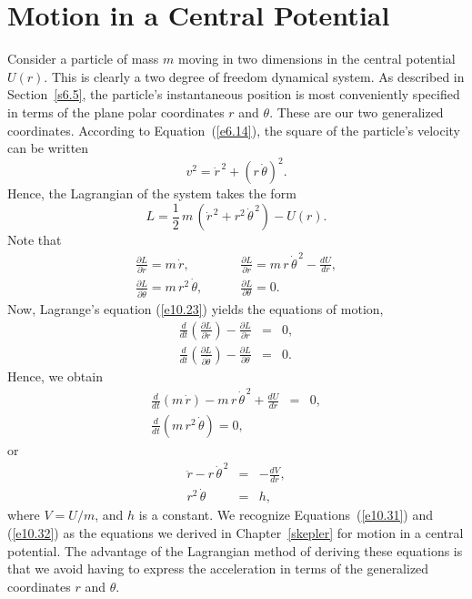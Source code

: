 \section{Motion in a Central Potential}\label{s10.5}
Consider a particle of mass $m$ moving in  two dimensions in the central potential $U(r)$. This is clearly a two degree of freedom dynamical system.
As described in Section~\ref{s6.5}, the particle's instantaneous position
is most conveniently specified in terms of the plane polar
coordinates $r$ and $\theta$. These are our two generalized coordinates.
According to Equation~(\ref{e6.14}), the square of the particle's velocity
can be written
\begin{equation}
v^2 = \dot{r}^{\,2} + (r\,\dot{\theta})^2.
\end{equation}
Hence, the Lagrangian of the system takes the form
\begin{equation}\label{e10.24}
L = \frac{1}{2}\,m\,(\dot{r}^{\,2} + r^2\,\dot{\theta}^{\,2}) - U(r).
\end{equation}
Note that
\begin{eqnarray}
\frac{\partial L}{\partial\dot{r}} = m\,\dot{r},&~~~~~~&\frac{\partial L}{\partial r} = m\,r\,\dot{\theta}^{\,2} - \frac{dU}{dr},\\[0.5ex]
\frac{\partial L}{\partial \dot{\theta}} = m\,r^2\,\dot{\theta},&&\frac{\partial L}{\partial\theta} = 0.
\end{eqnarray}
Now, Lagrange's equation (\ref{e10.23}) yields the equations of motion,
\begin{eqnarray}
\frac{d}{dt}\!\left(\frac{\partial L}{\partial\dot{r}}\right)- \frac{\partial L}{\partial r} &=& 0,\\[0.5ex]
\frac{d}{dt}\!\left(\frac{\partial L}{\partial\dot{\theta}}\right)- \frac{\partial L}{\partial \theta} &=& 0.
\end{eqnarray}
Hence, we obtain
\begin{eqnarray}
\frac{d}{dt}\!\left(m\,\dot{r}\right) - m\,r\,\dot{\theta}^{\,2} + \frac{dU}{dr} &=&0,\\[0.5ex]
\frac{d}{dt}\!\left(m\,r^2\,\dot{\theta}\right) = 0,
\end{eqnarray}
or
\begin{eqnarray}\label{e10.31}
\ddot{r} - r\,\dot{\theta}^{\,2}&=& - \frac{d V}{dr},\\[0.5ex]
r^2\,\dot{\theta}&=& h,\label{e10.32}
\end{eqnarray}
where $V = U/m$, and $h$ is a constant. We  recognize Equations~(\ref{e10.31}) and (\ref{e10.32}) as  the equations
we derived in Chapter~\ref{skepler} for motion in a central potential.
The advantage of the Lagrangian method of deriving these equations is
that we avoid having to express the acceleration in terms of the generalized
coordinates $r$ and $\theta$. 

